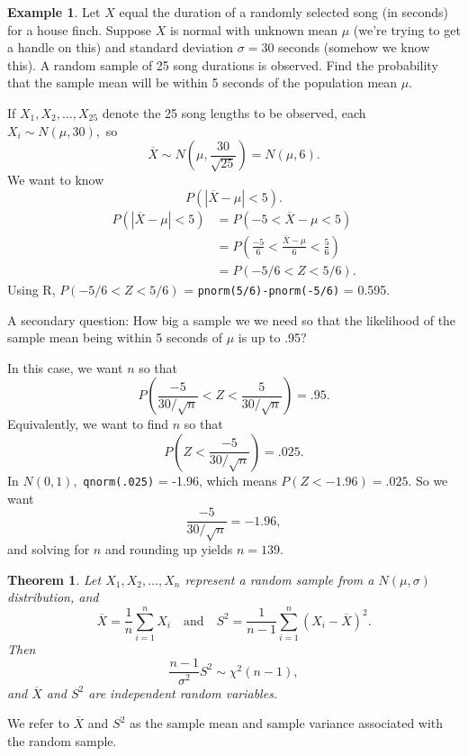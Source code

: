 \documentclass[
]{book}
\newtheorem{theorem}{Theorem}[chapter]
\theoremstyle{definition}
\theoremstyle{definition}
\newtheorem{example}{Example}[chapter]
\theoremstyle{definition}
\theoremstyle{definition}
\theoremstyle{remark}
\begin{document}
\begin{example}
\protect\hypertarget{exm:house-finch}{}\label{exm:house-finch}Let \(X\) equal the duration of a randomly selected song (in seconds) for a house finch. Suppose \(X\) is normal with unknown mean \(\mu\) (we're trying to get a handle on this) and standard deviation \(\sigma = 30\) seconds (somehow we know this). A random sample of 25 song durations is observed. Find the probability that the sample mean will be within 5 seconds of the population mean \(\mu\).

If \(X_1, X_2, \ldots, X_{25}\) denote the 25 song lengths to be observed, each \(X_i \sim N(\mu,30),\) so \[\overline{X} \sim N\left(\mu,\frac{30}{\sqrt{25}}\right) = N(\mu,6).\]
We want to know \[P(|\overline{X}-\mu| < 5).\]
\begin{align*}
P(|\overline{X}-\mu| < 5) &= P(-5 < \overline{X}-\mu < 5)\\
                          &= P\left(\frac{-5}{6} < \frac{\overline{X}-\mu}{6} < \frac{5}{6}\right)\\
                          &= P(-5/6 < Z < 5/6).
\end{align*}
Using R, \(P(-5/6 < Z < 5/6)\) = \texttt{pnorm(5/6)-pnorm(-5/6)} = 0.595.

A secondary question: How big a sample we we need so that the likelihood of the sample mean being within 5 seconds of \(\mu\) is up to .95?

In this case, we want \(n\) so that
\[P\left(\frac{-5}{30/\sqrt{n}} < Z < \frac{5}{30/\sqrt{n}}\right) = .95.\]
Equivalently, we want to find \(n\) so that \[P\left(Z < \frac{-5}{30/\sqrt{n}}\right) = .025.\]
In \(N(0,1),\) \texttt{qnorm(.025)} = -1.96, which means \(P(Z < -1.96) = .025\).
So we want \[\frac{-5}{30/\sqrt{n}} = -1.96,\] and solving for \(n\) and rounding up yields \(n = 139\).
\end{example}

\begin{theorem}
\protect\hypertarget{thm:sample-variance-chisq}{}\label{thm:sample-variance-chisq}Let \(X_1, X_2, \ldots, X_n\) represent a random sample from a \(N(\mu,\sigma)\) distribution, and \[\overline{X} = \frac{1}{n} \sum_{i=1}^n X_i ~~~ \text { and } ~~~ S^2 = \frac{1}{n-1}\sum_{i=1}^n (X_i - \overline{X})^2.\] Then \[\frac{n-1}{\sigma^2}S^2 \sim \chi^2(n-1),\] and \(\overline{X}\) and \(S^2\) are independent random variables.
\end{theorem}

We refer to \(\overline{X}\) and \(S^2\) as the sample mean and sample variance associated with the random sample.
\end{document}

